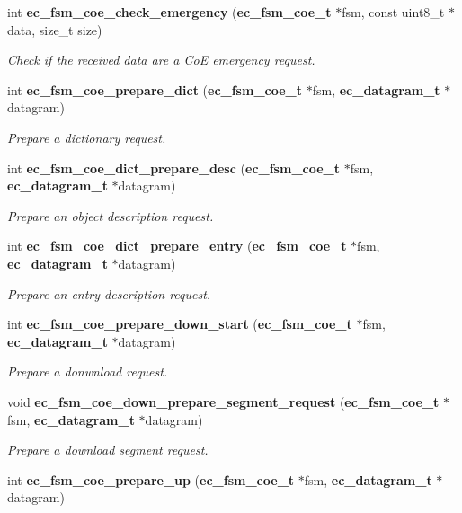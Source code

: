 \begin{DoxyCompactItemize}
int {\bf ec\-\_\-fsm\-\_\-coe\-\_\-check\-\_\-emergency} ({\bf ec\-\_\-fsm\-\_\-coe\-\_\-t} $\ast$fsm, const uint8\-\_\-t $\ast$data, size\-\_\-t size)
\begin{DoxyCompactList}\small\item\em Check if the received data are a Co\-E emergency request. \end{DoxyCompactList}\item 
int {\bf ec\-\_\-fsm\-\_\-coe\-\_\-prepare\-\_\-dict} ({\bf ec\-\_\-fsm\-\_\-coe\-\_\-t} $\ast$fsm, {\bf ec\-\_\-datagram\-\_\-t} $\ast$datagram)
\begin{DoxyCompactList}\small\item\em Prepare a dictionary request. \end{DoxyCompactList}\item 
int {\bf ec\-\_\-fsm\-\_\-coe\-\_\-dict\-\_\-prepare\-\_\-desc} ({\bf ec\-\_\-fsm\-\_\-coe\-\_\-t} $\ast$fsm, {\bf ec\-\_\-datagram\-\_\-t} $\ast$datagram)
\begin{DoxyCompactList}\small\item\em Prepare an object description request. \end{DoxyCompactList}\item 
int {\bf ec\-\_\-fsm\-\_\-coe\-\_\-dict\-\_\-prepare\-\_\-entry} ({\bf ec\-\_\-fsm\-\_\-coe\-\_\-t} $\ast$fsm, {\bf ec\-\_\-datagram\-\_\-t} $\ast$datagram)
\begin{DoxyCompactList}\small\item\em Prepare an entry description request. \end{DoxyCompactList}\item 
int {\bf ec\-\_\-fsm\-\_\-coe\-\_\-prepare\-\_\-down\-\_\-start} ({\bf ec\-\_\-fsm\-\_\-coe\-\_\-t} $\ast$fsm, {\bf ec\-\_\-datagram\-\_\-t} $\ast$datagram)
\begin{DoxyCompactList}\small\item\em Prepare a donwnload request. \end{DoxyCompactList}\item 
void {\bf ec\-\_\-fsm\-\_\-coe\-\_\-down\-\_\-prepare\-\_\-segment\-\_\-request} ({\bf ec\-\_\-fsm\-\_\-coe\-\_\-t} $\ast$fsm, {\bf ec\-\_\-datagram\-\_\-t} $\ast$datagram)
\begin{DoxyCompactList}\small\item\em Prepare a download segment request. \end{DoxyCompactList}\item 
int {\bf ec\-\_\-fsm\-\_\-coe\-\_\-prepare\-\_\-up} ({\bf ec\-\_\-fsm\-\_\-coe\-\_\-t} $\ast$fsm, {\bf ec\-\_\-datagram\-\_\-t} $\ast$datagram)

\end{DoxyCompactItemize}
